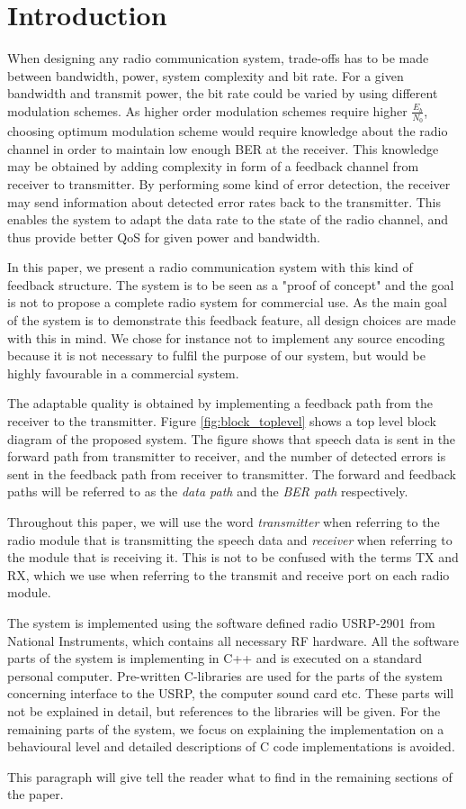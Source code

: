 \section{Introduction}
\label{sec:Introduction}
When designing any radio communication system, trade-offs has to be made between bandwidth, power, system complexity and bit rate. For a given bandwidth and transmit power, the bit rate could be varied by using different modulation schemes. As higher order modulation schemes require higher $\frac{E_b}{N_0}$, choosing optimum modulation scheme would require knowledge about the radio channel in order to maintain low enough BER at the receiver. This knowledge may be obtained by adding complexity in form of a feedback channel from receiver to transmitter. By performing some kind of error detection, the receiver may send information about detected error rates back to the transmitter. This enables the system to adapt the data rate to the state of the radio channel, and thus provide better QoS for given power and bandwidth. 

In this paper, we present a radio communication system with this kind of feedback structure. The system is to be seen as a "proof of concept" and the goal is not to propose a complete radio system for commercial use. As the main goal of the system is to demonstrate this feedback feature, all design choices are made with this in mind. We chose for instance not to implement any source encoding because it is not necessary to fulfil the purpose of our system, but would be highly favourable in a commercial system. 

The adaptable quality is obtained by implementing a feedback path from the receiver to the transmitter. Figure \ref{fig:block_toplevel} shows a top level block diagram of the proposed system. The figure shows that speech data is sent in the forward path from transmitter to receiver, and the number of detected errors is sent in the feedback path from receiver to transmitter. The forward and feedback paths will be referred to as the \textit{data path} and the \textit{BER path} respectively. 


Throughout this paper, we will use the word \textit{transmitter} when referring to the radio module that is transmitting the speech data and \textit{receiver} when referring to the module that is receiving it. This is not to be confused with the terms TX and RX, which we use when referring to the transmit and receive port on each radio module. 

The system is implemented using the software defined radio USRP-2901\cite{USRP2901} from National Instruments, which contains all necessary RF hardware. All the software parts of the system is implementing in C++ and is executed on a standard personal computer. Pre-written C-libraries are used for the parts of the system concerning interface to the USRP, the computer sound card etc. These parts will not be explained in detail, but references to the libraries will be given. For the remaining parts of the system, we focus on explaining the implementation on a behavioural level and detailed descriptions of C code implementations is avoided. 

This paragraph will give tell the reader what to find in the remaining sections of the paper. 

